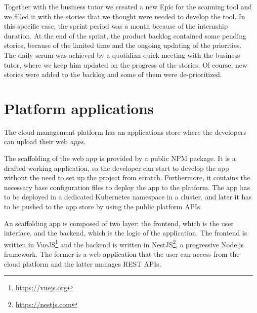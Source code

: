 Together with the business tutor we created a new Epic for the scanning tool and we filled it with the stories that we thought were needed to develop the tool. In this specific case, the sprint period was a month because of the internship duration. At the end of the sprint, the product backlog contained some pending stories, because of the limited time and the ongoing updating of the priorities. The daily scrum was achieved by a quotidian quick meeting with the business tutor, where we keep him updated on the progress of the stories. Of course, new stories were added to the backlog and some of them were de-prioritized.

\section{Platform applications}
\label{sec:platform-applications}

The cloud management platform has an applications store where the developers can upload their web \textit{apps}.

The scaffolding of the web app is provided by a public NPM package. It is a drafted working application, so the developer can start to develop the app without the need to set up the project from scratch. Furthermore, it contains the necessary base configuration files to deploy the app to the platform. The app has to be deployed in a dedicated Kubernetes namespace in a cluster, and later it has to be pushed to the app store by using the public platform APIs.

An scaffolding app is composed of two layer: the frontend, which is the user interface, and the backend, which is the logic of the application. The frontend is written in VueJS\footnote{\url{https://vuejs.org}} and the backend is written in NestJS\footnote{\url{https://nestjs.com}}, a progressive Node.js framework. The former is a web application that the user can access from the cloud platform and the latter manages REST APIs.

